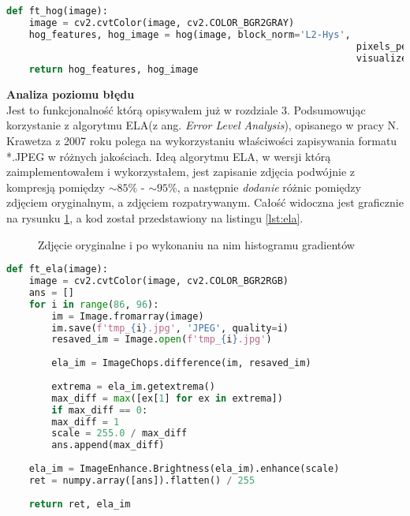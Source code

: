 \begin{lstlisting}[language=Python, caption=Histogram gradientów, captionpos=b, label={lst:hog}]
def ft_hog(image):
	image = cv2.cvtColor(image, cv2.COLOR_BGR2GRAY)
	hog_features, hog_image = hog(image, block_norm='L2-Hys', 
															  pixels_per_cell=(16, 16), cells_per_block=(1, 1), 
															  visualize=True)
	return hog_features, hog_image
\end{lstlisting}

\textbf{Analiza poziomu błędu} \\

Jest to funkcjonalność którą opisywałem już w rozdziale 3. Podsumowując korzystanie z algorytmu ELA(z ang. \textit{Error Level Analysis}), opisanego w pracy N. Krawetza z 2007 roku\cite{hacker} polega na wykorzystaniu właściwości zapisywania formatu *.JPEG w różnych jakościach. Ideą algorytmu ELA, w wersji którą zaimplementowałem i wykorzystałem, jest zapisanie zdjęcia podwójnie z kompresją pomiędzy $\sim85\%$ - $\sim95\%$, a następnie \textit{dodanie} różnic pomiędzy zdjęciem oryginalnym, a zdjęciem rozpatrywanym. Całość widoczna jest graficznie na rysunku \ref{fig:ela}, a kod został przedstawiony na listingu \ref{lst:ela}.

\begin{figure}[h!]
	\centering
	\qquad
	\caption{Zdjęcie oryginalne i po wykonaniu na nim histogramu gradientów}
	\label{fig:ela}
\end{figure}

\begin{lstlisting}[language=Python, caption=Analiza poziomu błędu, captionpos=b, label={lst:ela}]
def ft_ela(image):
	image = cv2.cvtColor(image, cv2.COLOR_BGR2RGB)
	ans = []
	for i in range(86, 96):
		im = Image.fromarray(image)
		im.save(f'tmp_{i}.jpg', 'JPEG', quality=i)
		resaved_im = Image.open(f'tmp_{i}.jpg')
		
		ela_im = ImageChops.difference(im, resaved_im)
		
		extrema = ela_im.getextrema()
		max_diff = max([ex[1] for ex in extrema])
		if max_diff == 0:
		max_diff = 1
		scale = 255.0 / max_diff
		ans.append(max_diff)
	
	ela_im = ImageEnhance.Brightness(ela_im).enhance(scale)
	ret = numpy.array([ans]).flatten() / 255
	
	return ret, ela_im
\end{lstlisting}

